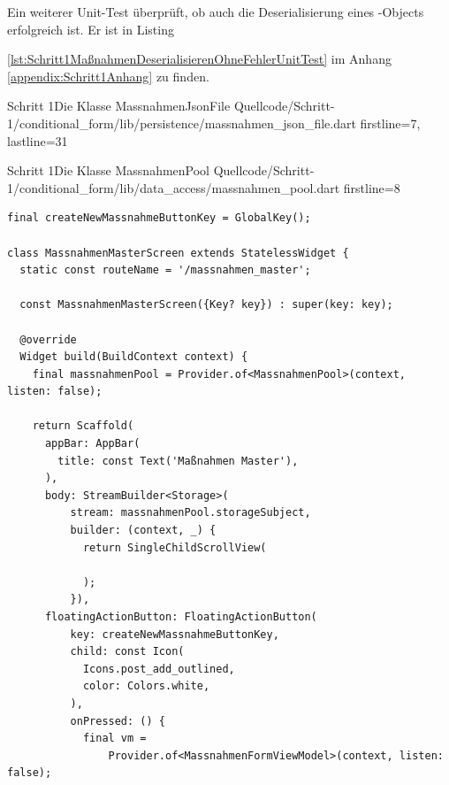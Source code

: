 Ein weiterer Unit-Test überprüft, ob auch die Deserialisierung eines -Objects erfolgreich ist. Er ist in Listing {\ref{lst:Schritt1MaßnahmenDeserialisierenOhneFehlerUnitTest} im Anhang \ref{appendix:Schritt1Anhang} zu finden.









\begin{alexlisting}{Schritt 1}{Die Klasse MassnahmenJsonFile}
  {Quellcode/Schritt-1/conditional_form/lib/persistence/massnahmen_json_file.dart}
  {firstline=7, lastline=31}
  \label{lst:Schritt1KlasseMassnahmenJsonFile}
\end{alexlisting}

\begin{alexlisting}{Schritt 1}{Die Klasse MassnahmenPool}
  {Quellcode/Schritt-1/conditional_form/lib/data_access/massnahmen_pool.dart}
  {firstline=8}
  \label{lst:Schritt1KlasseMassnahmenPool}
\end{alexlisting}















\begin{listing}[htbp]
  \renewcommand\theFancyVerbLine{%
    \ifnum\value{FancyVerbLine}=32
    \setcounter{FancyVerbLine}{94}
    \tiny\ldots
    \else
    \tiny\arabic{FancyVerbLine}%
    \fi
  }
  \begin{verbatim}
final createNewMassnahmeButtonKey = GlobalKey();

class MassnahmenMasterScreen extends StatelessWidget {
  static const routeName = '/massnahmen_master';

  const MassnahmenMasterScreen({Key? key}) : super(key: key);

  @override
  Widget build(BuildContext context) {
    final massnahmenPool = Provider.of<MassnahmenPool>(context, listen: false);

    return Scaffold(
      appBar: AppBar(
        title: const Text('Maßnahmen Master'),
      ),
      body: StreamBuilder<Storage>(
          stream: massnahmenPool.storageSubject,
          builder: (context, _) {
            return SingleChildScrollView(
              
            );
          }),
      floatingActionButton: FloatingActionButton(
          key: createNewMassnahmeButtonKey,
          child: const Icon(
            Icons.post_add_outlined,
            color: Colors.white,
          ),
          onPressed: () {
            final vm =
                Provider.of<MassnahmenFormViewModel>(context, listen: false);


\end{verbatim}
\end{listing}}
